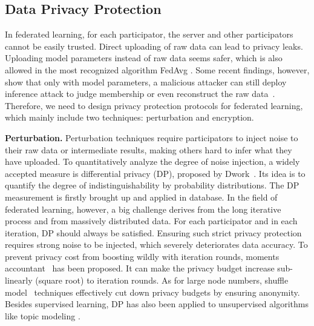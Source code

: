 \documentclass[11pt]{article}
\newcommand{\fakeparagraph}[1]{\vspace{1mm}\noindent\textbf{#1.}}
\begin{document}
\subsection{Data Privacy Protection}
In federated learning, for each participator, the server and other participators cannot be easily trusted. Direct uploading of raw data can lead to privacy leaks.
Uploading model parameters instead of raw data seems safer, which is also allowed in the most recognized algorithm FedAvg \cite{DBLP:conf/aistats/McMahanMRHA17}.
Some recent findings, however, show that only with model parameters, a malicious attacker can still deploy inference attack to judge membership or even reconstruct the raw data~\cite{DBLP:journals/tifs/PhongAHWM18}.
Therefore, we need to design privacy protection protocols for federated learning, which mainly include two techniques: perturbation and encryption.

\fakeparagraph{Perturbation}
Perturbation techniques require participators to inject noise to their raw data or intermediate results, making others hard to infer what they have uploaded.
To quantitatively analyze the degree of noise injection, a widely accepted measure is differential privacy (DP), proposed by Dwork~\cite{DBLP:conf/icalp/Dwork06}.
Its idea is to quantify the degree of indistinguishability by probability distributions.
The DP measurement is firstly brought up and applied in database. In the field of federated learning, however, a big challenge derives from the long iterative process and from massively distributed data. 
For each participator and in each iteration, DP should always be satisfied.
Ensuring such strict privacy protection requires strong noise to be injected, which severely deteriorates data accuracy.
To prevent privacy cost from boosting wildly with iteration rounds, moments accountant~\cite{DBLP:conf/ccs/AbadiCGMMT016} has been proposed. 
It can make the privacy budget increase sub-linearly (square root) to iteration rounds. 
As for large node numbers, shuffle model~\cite{DBLP:conf/soda/ErlingssonFMRTT19} techniques effectively cut down privacy budgets by ensuring anonymity.
Besides supervised learning, DP has also been applied to unsupervised algorithms like topic modeling \cite{DBLP:conf/cikm/JiangSTWZXY19, DBLP:conf/aaai/WangTS20}.
\end{document}
